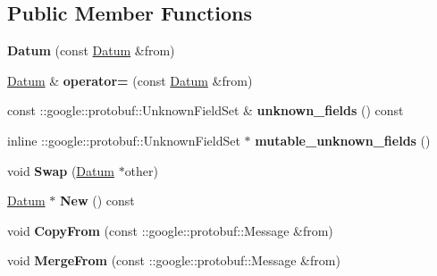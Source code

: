 \subsection*{Public Member Functions}
\begin{DoxyCompactItemize}
\item 
\mbox{\label{classcaffe_1_1_datum_a87cf03257728c2a435b74d1eae6f96da}} 
{\bfseries Datum} (const \mbox{\hyperlink{classcaffe_1_1_datum}{Datum}} \&from)
\item 
\mbox{\label{classcaffe_1_1_datum_abe1d05e07b4cdca15457b1d68889b51d}} 
\mbox{\hyperlink{classcaffe_1_1_datum}{Datum}} \& {\bfseries operator=} (const \mbox{\hyperlink{classcaffe_1_1_datum}{Datum}} \&from)
\item 
\mbox{\label{classcaffe_1_1_datum_a54bc1fe5a5f72dfabc42413f06dc389c}} 
const \+::google\+::protobuf\+::\+Unknown\+Field\+Set \& {\bfseries unknown\+\_\+fields} () const
\item 
\mbox{\label{classcaffe_1_1_datum_a5c2e7c405bb72ac9ea64fdd2f909c136}} 
inline \+::google\+::protobuf\+::\+Unknown\+Field\+Set $\ast$ {\bfseries mutable\+\_\+unknown\+\_\+fields} ()
\item 
\mbox{\label{classcaffe_1_1_datum_aae3c7206e0c99909b884089370596eef}} 
void {\bfseries Swap} (\mbox{\hyperlink{classcaffe_1_1_datum}{Datum}} $\ast$other)
\item 
\mbox{\label{classcaffe_1_1_datum_aa6a0152bf59766dc8348860cbdadc073}} 
\mbox{\hyperlink{classcaffe_1_1_datum}{Datum}} $\ast$ {\bfseries New} () const
\item 
\mbox{\label{classcaffe_1_1_datum_a21afb7231c1d1a8b425debd6ad83a499}} 
void {\bfseries Copy\+From} (const \+::google\+::protobuf\+::\+Message \&from)
\item 
\mbox{\label{classcaffe_1_1_datum_a0a5e31f5815864472205fc1998510be2}} 
void {\bfseries Merge\+From} (const \+::google\+::protobuf\+::\+Message \&from)
\item 
\mbox{\label{classcaffe_1_1_datum_a00a99c3cc2137407cf472a44dfe8a69a}} 

\end{DoxyCompactItemize}

